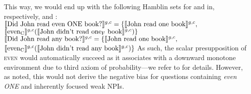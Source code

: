 \xe
\ex
[] 
\xe
This way, we would end up with the following Hamblin sets for  and  in, respectively,  and :
\ex
$\intension[g,c]{Did John read even \MakeUppercase{one} book?}=\{\intension[g,c]{John read one book},$\\\emptyfill$\intension[g,c]{even\textsubscript{C}}(\intension[g,c]{John didn't read one\textsubscript{F} book})\}$
\xe
\ex
$\intension[g,c]{Did John read any book?}=\{\intension[g,c]{John read one book},$\\\emptyfill$\intension[g,c]{even\textsubscript{C}}(\intension[g,c]{John didn't read any book})\}$
\xe
As such, the scalar presupposition of {\scshape even} would automatically succeed as it associates with a downward monotone environment due to  third axiom of probability---we refer to  for details. However, as \textcite{Crnic2014-dogma,Crnic2014-nm} noted, this would not derive the negative bias for questions containing \textit{even \MakeUppercase{one}} and inherently focused weak NPIs.

